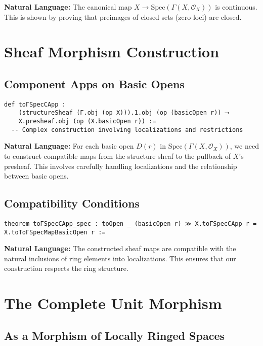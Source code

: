 \documentclass{article}
\theoremstyle{definition}
\begin{document}
\textbf{Natural Language:} The canonical map $X \to \mathrm{Spec}(\Gamma(X, \mathcal{O}_X))$ is continuous. This is shown by proving that preimages of closed sets (zero loci) are closed.

\section{Sheaf Morphism Construction}

\subsection{Component Apps on Basic Opens}

\begin{lstlisting}
def toΓSpecCApp :
    (structureSheaf (Γ.obj (op X))).1.obj (op (basicOpen r)) ⟶
    X.presheaf.obj (op (X.basicOpen r)) :=
  -- Complex construction involving localizations and restrictions
\end{lstlisting}

\textbf{Natural Language:} For each basic open $D(r)$ in $\mathrm{Spec}(\Gamma(X, \mathcal{O}_X))$, we need to construct compatible maps from the structure sheaf to the pullback of $X$'s presheaf. This involves carefully handling localizations and the relationship between basic opens.

\subsection{Compatibility Conditions}

\begin{lstlisting}
theorem toΓSpecCApp_spec : toOpen _ (basicOpen r) ≫ X.toΓSpecCApp r = X.toToΓSpecMapBasicOpen r :=
\end{lstlisting}

\textbf{Natural Language:} The constructed sheaf maps are compatible with the natural inclusions of ring elements into localizations. This ensures that our construction respects the ring structure.

\section{The Complete Unit Morphism}

\subsection{As a Morphism of Locally Ringed Spaces}
\end{document}
